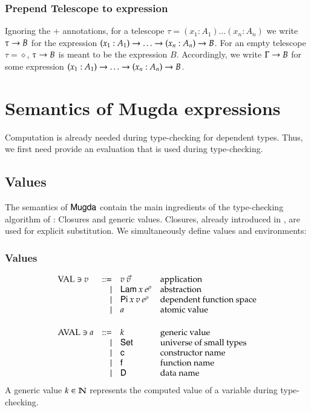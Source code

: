 \subsubsection{Prepend Telescope to expression}
Ignoring the $+$ annotations, for a telescope $\tau = (x_1 : A_1) \ldots (x_n : A_n)$ we write $\tau \rightarrow B$ for the expression $( x_1 : A_1 ) \rightarrow{\ldots \rightarrow( x_n : A_n ) \rightarrow{B}}$.
For an empty telescope $\tau = \diamond$, $\tau \rightarrow B$ is meant to be the expression $B$.
Accordingly, we write $\Gamma \rightarrow B$ for some expression $( x_1 : A_1 ) \rightarrow{\ldots \rightarrow( x_n : A_n ) \rightarrow{B}}$.


\section{Semantics of Mugda expressions}
Computation is already needed during type-checking for dependent types.
Thus, we first need provide an evaluation that is used during type-checking.

\subsection{Values}

The semantics of $\textsf{Mugda}$ contain the main ingredients of the type-checking algorithm of \cite{coquand96algorithm}: Closures and generic values.
Closures, already introduced in \cite{Landin63}, are used for explicit substitution.
We simultaneously define values and environments:

\subsubsection{Values}
\[
\begin{array}{lrll}
\Val \ni v & ::= & v \: \vec{v} & \mbox{application}\\
& \mid & \vlam \: x \: \cl{e}{\rho} & \mbox{abstraction}\\
& \mid & \vpi \: x \: v \: \cl{e}{\rho} & \mbox{dependent function space}\\
& \mid & a & \mbox{atomic value}\\
\vs\\
\AVal \ni a & ::= & k & \mbox{generic value}\\
& \mid & \Set & \mbox{universe of small types} \\
& \mid & \cc & \mbox{constructor name}\\
& \mid & \ff & \mbox{function name}\\
& \mid & \DD & \mbox{data name}\\
\end{array}
\]
A generic value $k \in \mathbb{N}$ represents the computed value of a variable during type-checking.

